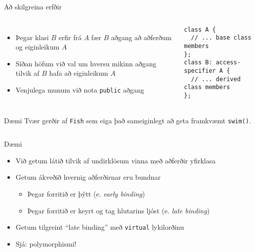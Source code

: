 \documentclass[handout]{beamer}
\begin{document}
\begin{frame}[fragile]{Að skilgreina erfðir}
\begin{columns}
\begin{itemize}
 \item Þegar klasi $B$ erfir frá $A$ fær $B$ aðgang að aðferðum og eiginleikum $A$
 \item Síðan höfum við val um hversu mikinn aðgang tilvik af $B$ hafa að eiginleikum $A$
 \item Venjulega munum við nota \texttt{public} aðgang
\end{itemize}
\begin{verbatim}
class A {
  // ... base class members
};
class B: access-specifier A {
  // ... derived class members
};
\end{verbatim}
\end{columns}
\end{frame}

\begin{frame}[fragile]{Dæmi}
Tvær gerðir af \texttt{Fish} sem eiga það sameiginlegt að geta framkvæmt \texttt{swim()}.
\begin{columns}
\end{columns}
\end{frame}

\begin{frame}{Dæmi}
\begin{itemize}
 \item Við getum látið tilvik af undirklösum vinna með aðferðir yfirklasa
 \item Getum ákveðið hvernig aðferðirnar eru bundnar
 \begin{itemize}
  \item Þegar forritið er þýtt (e. \emph{early binding})
  \item Þegar forritið er keyrt og tag hlutarins ljóst (e. \emph{late binding})
 \end{itemize}
 \item Getum tilgreint ``late binding'' með \texttt{virtual} lykilorðinu
 \item Sjá: polymorphismi!
\end{itemize}
\end{frame}
\end{document}
